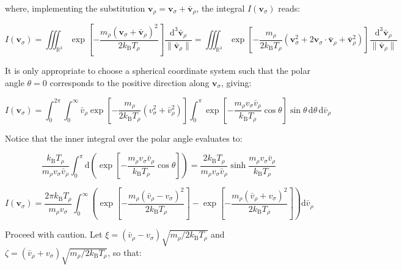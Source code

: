 where, implementing the substitution $\mathbf{v}_\rho=\mathbf{v}_\sigma+\bar{\mathbf{v}}_\rho$, the integral $I(\mathbf{v}_\sigma)$ reads:

\begin{equation}
    I(\mathbf{v}_\sigma)=\iiint_{\mathbb{R}^3}\exp{\left[-\frac{m_\rho(\mathbf{v}_\sigma+\bar{\mathbf{v}}_\rho)^2}{2k_\mathrm{B}T_\rho}\right]}\frac{\mathrm{d}^3\bar{\mathbf{v}}_\rho}{\|\bar{\mathbf{v}}_\rho\|}=\iiint_{\mathbb{R}^3}\exp{\left[-\frac{m_\rho}{2k_\mathrm{B}T_\rho}\left(\mathbf{v}_\sigma^2+2\mathbf{v}_\sigma\cdot\bar{\mathbf{v}}_\rho+\bar{\mathbf{v}}_\rho^2\right)\right]}\frac{\mathrm{d}^3\bar{\mathbf{v}}_\rho}{\|\bar{\mathbf{v}}_\rho\|}
\end{equation}

It is only appropriate to choose a spherical coordinate system such that the polar angle $\theta=0$ corresponds to the positive direction along $\mathbf{v}_\sigma$, giving:

\begin{equation}
    I(\mathbf{v}_\sigma)=\int_0^{2\pi}\int_0^\infty\bar{v}_\rho\exp{\left[-\frac{m_\rho}{2k_\mathrm{B}T_\rho}(v_\sigma^2+\bar{v}_\rho^2)\right]}\int_0^\pi\exp{\left[-\frac{m_\rho v_\sigma\bar{v}_\rho}{k_\mathrm{B}T_\rho}\cos{\theta}\right]}\sin{\theta}\,\mathrm{d}\theta\,\mathrm{d}\bar{v}_\rho
\end{equation}

Notice that the inner integral over the polar angle evaluates to:

\begin{equation}
    \frac{k_\mathrm{B}T_\rho}{m_\rho v_\sigma\bar{v}_\rho}\int_0^\pi\mathrm{d}\left(\exp{\left[-\frac{m_\rho v_\sigma\bar{v}_\rho}{k_\mathrm{B}T_\rho}\cos{\theta}\right]}\right)=\frac{2k_\mathrm{B}T_\rho}{m_\rho v_\sigma\bar{v}_\rho}\sinh{\frac{m_\rho v_\sigma\bar{v}_\rho}{k_\mathrm{B}T_\rho}}
\end{equation}

\begin{equation}
    I(\mathbf{v}_\sigma)=\frac{2\pi k_\mathrm{B}T_\rho}{m_\rho v_\sigma}\int_0^\infty\left(\exp{\left[-\frac{m_\rho(\bar{v}_\rho -v_\sigma)^2}{2k_\mathrm{B}T_\rho}\right]}-\exp{\left[-\frac{m_\rho(\bar{v}_\rho+v_\sigma)^2}{2k_\mathrm{B}T_\rho}\right]}\right)\mathrm{d}\bar{v}_\rho
\end{equation}

Proceed with caution. Let $\xi=(\bar{v}_\rho-v_\sigma)\sqrt{m_\rho/2k_\mathrm{B}T_\rho}$ and $\zeta=(\bar{v}_\rho+v_\sigma)\sqrt{m_\rho/2k_\mathrm{B}T_\rho}$, so that:

